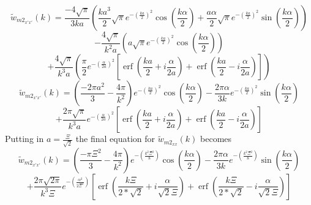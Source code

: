 \documentclass[letterpaper,twocolumn,amsmath,amssymb,prb]{revtex4-1}
\begin{document}
\begin{widetext}
\[{}\]
\begin{displaymath}{\widetilde{w}_{{m2}_{x'x'}}(k)=\frac{-4\sqrt{\pi}}{3ka}\left(\frac{ka^3}{2}\sqrt{\pi}e^{-\left(\frac{ka}{2}\right)^2}\cos(\frac{k\alpha}{2})+\frac{a\alpha}{2}\sqrt{\pi}e^{-\left(\frac{ka}{2}\right)^2}\sin(\frac{k\alpha}{2})\right)}\end{displaymath} 
\begin{displaymath}{-\frac{4\sqrt{\pi}}{k^2a}\left(a\sqrt{\pi}e^{-\left(\frac{ka}{2}\right)^2}\cos(\frac{k\alpha}{2})\right)}\end{displaymath} 
\begin{equation}{+\frac{4\sqrt{\pi}}{k^3a}\left(\frac{\pi}{2}e^{-\left(\frac{\alpha}{2a}\right)^2}\left[\operatorname{erf}\left(\frac{ka}{2}+i\frac{\alpha}{2a}\right)+\operatorname{erf}\left(\frac{ka}{2}-i\frac{\alpha}{2a}\right)\right]\right)}\end{equation} 
\[{}\]
\begin{displaymath}{\widetilde{w}_{{m2}_{x'x'}}(k)=\left(\frac{-2\pi{a}^2}{3}-\frac{4\pi}{k^2}\right)e^{-\left(\frac{ka}{2}\right)^2}   \cos(\frac{k\alpha}{2})-\frac{2\pi\alpha}{3k}e^{-\left(\frac{ka}{2}\right)^2}\sin(\frac{k\alpha}{2})}\end{displaymath} 
\begin{equation}{+\frac{2\pi\sqrt{\pi}}{k^3a}e^{-\left(\frac{\alpha}{2a}\right)^2}\left[\operatorname{erf}\left(\frac{ka}{2}+i\frac{\alpha}{2a}\right)+\operatorname{erf}\left(\frac{ka}{2}-i\frac{\alpha}{2a}\right)\right]}\end{equation} 
\[{}\] 
Putting in $a=\frac{\Xi}{\sqrt{2}}$ the final equation for $\widetilde{w}_{{m2}_{xx}}(k)$ becomes
\color{green}
\begin{displaymath}{\widetilde{w}_{{m2}_{x'x'}}(k)=\left(\frac{-\pi\Xi^2}{3}-\frac{4\pi}{k^2}\right)e^{-\left(\frac{k^2\Xi^2}{8}\right)}\cos(\frac{k\alpha}{2})-\frac{2\pi\alpha}{3k}e^{-\left(\frac{k^2\Xi^2}{8}\right)}\sin(\frac{k\alpha}{2})}\end{displaymath} 
\begin{equation}{+\frac{2\pi\sqrt{2\pi}}{k^3\Xi}e^{-\left(\frac{\alpha^2}{2\Xi^2}\right)}\left[\operatorname{erf}\left(\frac{k\Xi}{2*\sqrt{2}}+i\frac{\alpha}{\sqrt{2}\Xi}\right)+\operatorname{erf}\left(\frac{k\Xi}{2*\sqrt{2}}-i\frac{\alpha}{\sqrt{2}\Xi}\right)\right]}\end{equation} 
\color{black}
\[{}\]
 

\end{widetext}
\end{document}
